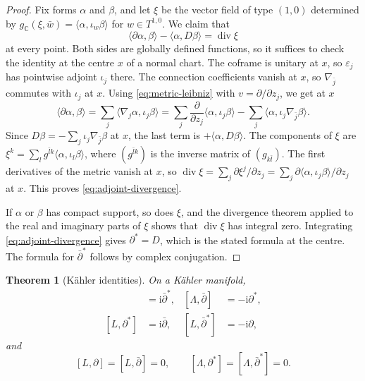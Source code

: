 \documentclass[11pt,reqno]{amsart}
\newtheorem{theorem}{Theorem}[section]
\theoremstyle{definition}
\theoremstyle{remark}
\newcommand{\C}{\mathbb{C}}
\newcommand{\ii}{\mathrm{i}}
\newcommand{\dbar}{\bar\partial}
\DeclareMathOperator{\divergence}{div}
\begin{document}
\begin{proof}
Fix forms $\alpha$ and $\beta$, and let $\xi$ be the vector field of type
$(1,0)$ determined by
$g_{\C}(\xi,\bar w)=\langle\alpha,\iota_w\beta\rangle$ for $w\in T^{1,0}$.
We claim that
\begin{equation}
\label{eq:adjoint-divergence}
\langle\partial\alpha,\beta\rangle-\langle\alpha,D\beta\rangle
=\divergence\xi
\end{equation}
at every point. Both sides are globally defined functions, so it suffices to
check the identity at the centre $x$ of a normal chart. The coframe is
unitary at $x$, so $\varepsilon_j$ has pointwise adjoint $\iota_j$ there.
The connection coefficients vanish at $x$, so $\nabla_{\bar j}$ commutes
with $\iota_j$ at $x$. Using \eqref{eq:metric-leibniz} with
$v=\partial/\partial z_j$, we get at $x$
\[
\langle\partial\alpha,\beta\rangle
=\sum_j\langle\nabla_j\alpha,\iota_j\beta\rangle
=\sum_j\frac{\partial}{\partial z_j}\langle\alpha,\iota_j\beta\rangle
-\sum_j\langle\alpha,\iota_j\nabla_{\bar j}\beta\rangle.
\]
Since $D\beta=-\sum_j\iota_j\nabla_{\bar j}\beta$ at $x$, the last term is
$+\langle\alpha,D\beta\rangle$. The components of $\xi$ are
$\xi^k=\sum_l g^{\bar lk}\langle\alpha,\iota_l\beta\rangle$, where
$(g^{\bar lk})$ is the inverse matrix of $(g_{k\bar l})$. The first
derivatives of the metric vanish at $x$, so
$\divergence\xi=\sum_j\partial\xi^j/\partial z_j
=\sum_j\partial\langle\alpha,\iota_j\beta\rangle/\partial z_j$ at $x$.
This proves \eqref{eq:adjoint-divergence}.

If $\alpha$ or $\beta$ has compact support, so does $\xi$, and the divergence
theorem applied to the real and imaginary parts of $\xi$ shows that
$\divergence\xi$ has integral zero. Integrating
\eqref{eq:adjoint-divergence} gives $\partial^*=D$, which is the stated
formula at the centre. The formula for $\dbar^*$ follows by complex
conjugation.
\end{proof}

\begin{theorem}[K\"ahler identities]
\label{thm:kahler-identities}
On a K\"ahler manifold,
\begin{align}
[\Lambda,\partial]&=\ii\dbar^*,
&
[\Lambda,\dbar]&=-\ii\partial^*,
\label{eq:kahler-first}\\
[L,\partial^*]&=\ii\dbar,
&
[L,\dbar^*]&=-\ii\partial,
\label{eq:kahler-second}
\end{align}
and
\[
[L,\partial]=[L,\dbar]=0,
\qquad
[\Lambda,\partial^*]=[\Lambda,\dbar^*]=0.
\]
\end{theorem}
\end{document}
